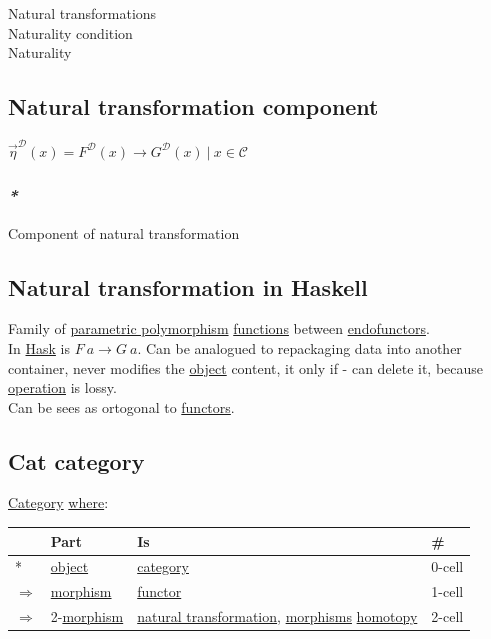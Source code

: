 \documentclass[a4paper,14pt,oneside]{book}
\begin{document}
\label{org0a17d6b}Natural transformations\\
\label{org1895c53}Naturality condition\\
\label{orgba275ed}Naturality\\

\subsection{\label{orgc436576}Natural transformation component}
\label{sec:orge0f6384}
\(\overrightarrow{\eta}^{\mathcal{D}}(x) = F^{\mathcal{D}}(x) \to G^{\mathcal{D}}(x) \ | \  x \in \mathcal{C}\)\\

\subsubsection{\emph{*}}
\label{sec:org20df856}

\label{org7db958c}Component of natural transformation\\

\subsection{\label{org055bacc}Natural transformation in Haskell}
\label{sec:org5f33631}
Family of \hyperref[org20ebf55]{parametric polymorphism} \hyperref[org3faae40]{functions} between \hyperref[org07ebb4d]{endofunctors}.\\

In \hyperref[orgd9881bf]{Hask} is \(F \ a \to G \ a\). Can be analogued to repackaging data into another container, never modifies the \hyperref[orgd91c1e9]{object} content, it only if - can delete it, because \hyperref[orgaaa67fd]{operation} is lossy.\\

Can be sees as ortogonal to \hyperref[org4c40409]{functors}.\\

\subsection{\label{orgdd45ba6}Cat category}
\label{sec:org0ea7b76}
\hyperref[org3c67ba2]{Category} \hyperref[orged8f735]{where}:\\

\begin{center}
\begin{tabular}{llll}
 & Part & Is & \#\\
\hline
* & \hyperref[orgd91c1e9]{object} & \hyperref[org3c67ba2]{category} & 0-cell\\
\(\Rightarrow\) & \hyperref[orgc8e65fb]{morphism} & \hyperref[org295abf8]{functor} & 1-cell\\
\(\Rightarrow\) & 2-\hyperref[orgc8e65fb]{morphism} & \hyperref[orgca1a329]{natural transformation}, \hyperref[org6a239db]{morphisms} \hyperref[orgecf29b2]{homotopy} & 2-cell\\
\end{tabular}
\end{center}
\end{document}
